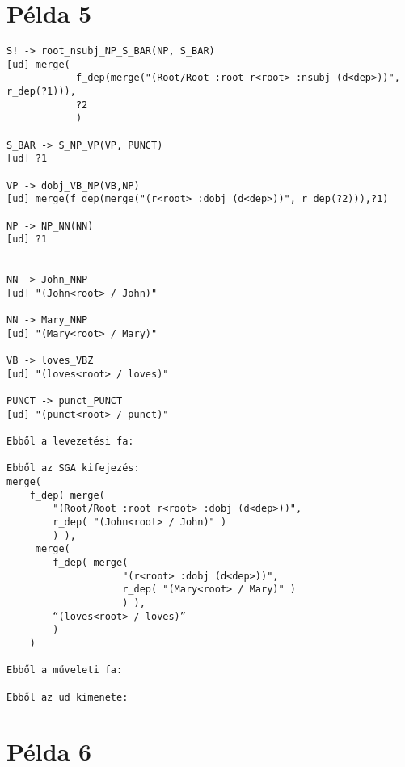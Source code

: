 \section{Példa 5}
\label{sec:example5}

\begin{verbatim}
S! -> root_nsubj_NP_S_BAR(NP, S_BAR)
[ud] merge(
			f_dep(merge("(Root/Root :root r<root> :nsubj (d<dep>))", r_dep(?1))),
	 		?2
	 		)

S_BAR -> S_NP_VP(VP, PUNCT)
[ud] ?1

VP -> dobj_VB_NP(VB,NP)
[ud] merge(f_dep(merge("(r<root> :dobj (d<dep>))", r_dep(?2))),?1)

NP -> NP_NN(NN)
[ud] ?1


NN -> John_NNP
[ud] "(John<root> / John)"

NN -> Mary_NNP
[ud] "(Mary<root> / Mary)"

VB -> loves_VBZ
[ud] "(loves<root> / loves)"

PUNCT -> punct_PUNCT
[ud] "(punct<root> / punct)"

Ebből a levezetési fa:

Ebből az SGA kifejezés:
merge(
	f_dep( merge(
		"(Root/Root :root r<root> :dobj (d<dep>))",
 		r_dep( "(John<root> / John)" )
		) ),
	 merge(
		f_dep( merge(
					"(r<root> :dobj (d<dep>))", 
					r_dep( "(Mary<root> / Mary)" )
					) ),
 		“(loves<root> / loves)”
		)
	)

Ebből a műveleti fa:

Ebből az ud kimenete:

\end{verbatim}



\section{Példa 6}
\label{sec:example6}

